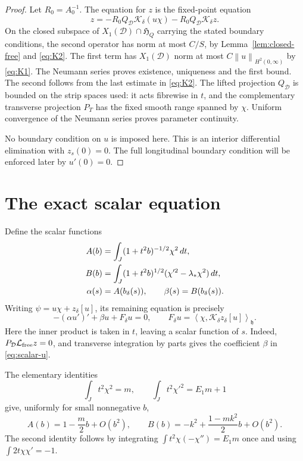 \documentclass[11pt,a4paper]{article}
\newcommand{\D}{\mathcal D}
\newcommand{\Lop}{\mathcal L}
\newcommand{\Kop}{\mathcal K}
\newcommand{\norm}[1]{\left\lVert#1\right\rVert}
\newcommand{\ip}[2]{\left\langle#1,#2\right\rangle}
\begin{document}
\begin{proof}
Let $R_0=A_0^{-1}$. The equation for $z$ is the fixed-point equation
\begin{equation}\label{eq:z-fp}
 z=-R_0Q_{\D}\Kop_\delta(u\chi)-R_0Q_{\D}\Kop_\delta z.
\end{equation}
On the closed subspace of $X_1(\D)\cap\mathfrak H_Q$ carrying the
stated boundary conditions, the second operator has norm at most $C/S$,
by Lemma~\ref{lem:closed-free} and \eqref{eq:K2}. The first term has
$X_1(\D)$ norm at most $C\norm{u}_{H^2(0,\infty)}$ by \eqref{eq:K1}.
The Neumann series proves existence, uniqueness and the first bound.
The second follows from the last estimate in \eqref{eq:K2}.
The lifted projection $Q_{\D}$ is bounded on the strip spaces used:
it acts fibrewise in $t$, and the complementary transverse projection
$P_T$ has the fixed smooth range spanned by $\chi$.
Uniform convergence of the Neumann series proves parameter continuity.

No boundary condition on $u$ is imposed here. This is an interior
differential elimination with $z_s(0)=0$. The full longitudinal boundary
condition will be enforced later by $u'(0)=0$.
\end{proof}

\section{The exact scalar equation}

Define the scalar functions
\begin{align}
 A(b)&=\int_J(1+t^2b)^{-1/2}\chi^2\,dt,\notag\\
 B(b)&=\int_J(1+t^2b)^{1/2}
           (\chi'^2-\lambda_*\chi^2)\,dt,\notag\\
 \alpha(s)&=A(b_\delta(s)),\qquad
 \beta(s)=B(b_\delta(s)).\label{eq:alpha-beta}
\end{align}
Writing $\psi=u\chi+z_\delta[u]$, its remaining equation is precisely
\begin{equation}\label{eq:scalar-u}
 -(\alpha u')'+\beta u+F_\delta u=0,\qquad
 F_\delta u=\ip{\chi}{\Kop_\delta z_\delta[u]}_{\mathfrak h}.
\end{equation}
Here the inner product is taken in $t$, leaving a scalar function of $s$.
Indeed, $P_{\D}\Lop_{\rm free}z=0$, and transverse integration by parts gives
the coefficient $\beta$ in \eqref{eq:scalar-u}.

The elementary identities
\[
 \int_Jt^2\chi^2=m,\qquad
 \int_Jt^2\chi'^2=E_1m+1
\]
give, uniformly for small nonnegative $b$,
\begin{equation}\label{eq:expansion}
 A(b)=1-\frac m2b+O(b^2),\qquad
 B(b)=-k^2+\frac{1-mk^2}{2}b+O(b^2).
\end{equation}
The second identity follows by integrating
$\int t^2\chi(-\chi'')=E_1m$ once and using $\int 2t\chi\chi'=-1$.
\end{document}

